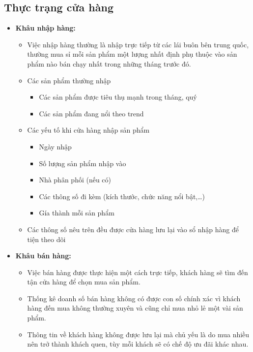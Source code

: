 \subsection{Thực trạng cửa hàng}
\begin{itemize}
	\item\textbf{Khâu nhập hàng:}\par
	      \vspace{-1em}
	      \begin{itemize}
		      \item Việc nhập hàng thường là nhập trực tiếp từ các lái buôn bên trung quốc, thường mua sỉ mỗi sản phẩm một lượng nhất định phụ thuộc vào sản phẩm nào bán chạy nhất trong những tháng trước đó.
		      \item Các sản phẩm thường nhập
		            \begin{itemize}
			            \item Các sản phẩm được tiêu thụ mạnh trong tháng, quý
			            \item Các sản phẩm đang nổi theo trend
		            \end{itemize}
		      \item Các yếu tố khi cửa hàng nhập sản phẩm
		            \begin{itemize}
			            \item Ngày nhập
			            \item Số lượng sản phẩm nhập vào
			            \item Nhà phân phối (nếu có)
			            \item Các thông số đi kèm (kích thước, chức năng nổi bật,\dots)
			            \item Gía thành mỗi sản phẩm
		            \end{itemize}
		      \item Các thông số nêu trên đều được cửa hàng lưu lại vào sổ nhập hàng để tiện theo dõi
	      \end{itemize}
	\item\textbf{Khâu bán hàng:}\par
	      \begin{itemize}
		      \item Việc bán hàng được thực hiện một cách trực tiếp, khách hàng sẽ tìm đến tận cửa hàng để chọn mua sản phẩm.
		      \item Thống kê doanh số bán hàng không có được con số chính xác vì khách hàng đến mua không thường xuyên và cũng chỉ mua nhỏ lẻ một vài sản phẩm.
		      \item Thông tin về khách hàng không được lưu lại mà chủ yếu là do mua nhiều nên trở thành khách quen, tùy mỗi khách sẽ có chế độ ưu đãi khác nhau.

\end{itemize}
\end{itemize}
